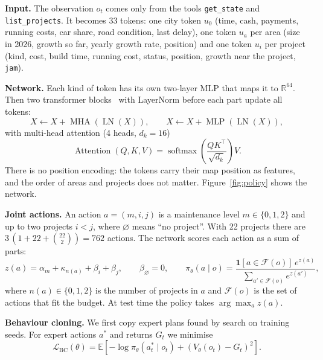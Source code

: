 \documentclass{article}
\begin{document}
\textbf{Input.} The observation $o_t$ comes only from the tools \texttt{get\_state} and \texttt{list\_projects}. It becomes 33 tokens: one city token $u_0$ (time, cash, payments, running costs, car share, road condition, last delay), one token $u_a$ per area (size in 2026, growth so far, yearly growth rate, position) and one token $u_i$ per project (kind, cost, build time, running cost, status, position, growth near the project, \texttt{jam}).

\textbf{Network.} Each kind of token has its own two-layer MLP that maps it to $\mathbb{R}^{64}$. Then two transformer blocks~\cite{vaswani2017} with LayerNorm before each part update all tokens:
\begin{equation}
X\leftarrow X+\operatorname{MHA}(\operatorname{LN}(X)),\qquad X\leftarrow X+\operatorname{MLP}(\operatorname{LN}(X)),
\end{equation}
with multi-head attention (4 heads, $d_k=16$)
\begin{equation}
\operatorname{Attention}(Q,K,V)=\operatorname{softmax}\!\left(\frac{QK^\top}{\sqrt{d_k}}\right)V .
\end{equation}
There is no position encoding: the tokens carry their map position as features, and the order of areas and projects does not matter. Figure~\ref{fig:policy} shows the network.

\textbf{Joint actions.} An action $a=(m,i,j)$ is a maintenance level $m\in\{0,1,2\}$ and up to two projects $i<j$, where $\varnothing$ means ``no project''. With 22 projects there are $3\,(1+22+\binom{22}{2})=762$ actions. The network scores each action as a sum of parts:
\begin{equation}\label{eq:joint}
z(a)=\alpha_m+\kappa_{n(a)}+\beta_i+\beta_j,\qquad \beta_\varnothing=0,\qquad
\pi_\theta(a\mid o)=\frac{\mathbf{1}[a\in\mathcal{F}(o)]\,e^{z(a)}}{\sum_{a'\in\mathcal{F}(o)}e^{z(a')}},
\end{equation}
where $n(a)\in\{0,1,2\}$ is the number of projects in $a$ and $\mathcal{F}(o)$ is the set of actions that fit the budget. At test time the policy takes $\arg\max_a z(a)$.

\textbf{Behaviour cloning.} We first copy expert plans found by search on training seeds. For expert actions $a^*$ and returns $G_t$ we minimise
\begin{equation}
\mathcal{L}_{\text{BC}}(\theta)=\mathbb{E}\left[-\log\pi_\theta(a^*_t\mid o_t)+\left(V_\theta(o_t)-G_t\right)^2\right].
\end{equation}
\end{document}
